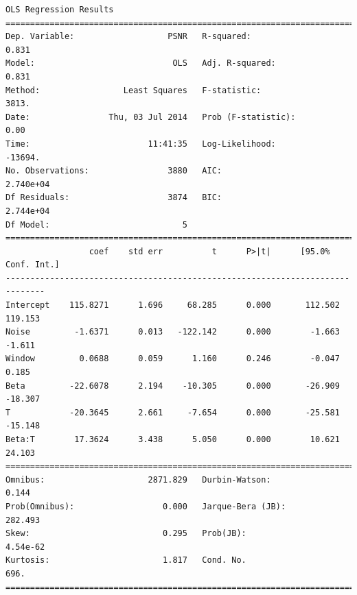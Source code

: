 \documentclass[11pt]{article}
\theoremstyle{definition}
\begin{document}
{\begin{lstlisting}[caption = Time Series 2 - Non-Local Means OLS Model, label = {nlmeansfilterseries2}]
                            OLS Regression Results                            
==============================================================================
Dep. Variable:                   PSNR   R-squared:                       0.831
Model:                            OLS   Adj. R-squared:                  0.831
Method:                 Least Squares   F-statistic:                     3813.
Date:                Thu, 03 Jul 2014   Prob (F-statistic):               0.00
Time:                        11:41:35   Log-Likelihood:                -13694.
No. Observations:                3880   AIC:                         2.740e+04
Df Residuals:                    3874   BIC:                         2.744e+04
Df Model:                           5                                         
==============================================================================
                 coef    std err          t      P>|t|      [95.0% Conf. Int.]
------------------------------------------------------------------------------
Intercept    115.8271      1.696     68.285      0.000       112.502   119.153
Noise         -1.6371      0.013   -122.142      0.000        -1.663    -1.611
Window         0.0688      0.059      1.160      0.246        -0.047     0.185
Beta         -22.6078      2.194    -10.305      0.000       -26.909   -18.307
T            -20.3645      2.661     -7.654      0.000       -25.581   -15.148
Beta:T        17.3624      3.438      5.050      0.000        10.621    24.103
==============================================================================
Omnibus:                     2871.829   Durbin-Watson:                   0.144
Prob(Omnibus):                  0.000   Jarque-Bera (JB):              282.493
Skew:                           0.295   Prob(JB):                     4.54e-62
Kurtosis:                       1.817   Cond. No.                         696.
==============================================================================
\end{lstlisting}

}
\end{document}
